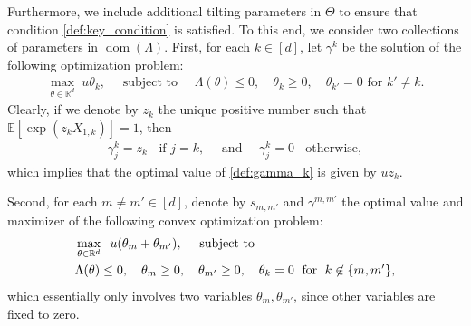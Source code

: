 \documentclass[aap,preprint]{imsart}
\newcommand{\Exp}{{\mathbb{E}}}
\newcommand{\bR}{{\mathbb{R}}}
\theoremstyle{plain}
\theoremstyle{definition}
\begin{document}
 

Furthermore, we include additional tilting parameters in $\Theta$ to ensure that condition \eqref{def:key_condition} is satisfied. 
To this end, we consider two collections of parameters in $\operatorname{dom}(\Lambda)$. 
First, for each $k \in [d]$, let $\gamma^k$ be the  solution of the following optimization problem:
\begin{align}
\label{def:gamma_k}
\max_{\theta \in \bR^d} \; u \theta_k,\quad \text{ subject to }\quad
\Lambda(\theta) \leq 0, \quad\theta_k \geq 0, \quad\theta_{k'} = 0 \text{ for } k' \neq k.
\end{align}
Clearly, if we denote by $z_k$ the unique positive number such that $\Exp[\exp(z_k X_{1,k})] = 1$, then 
\begin{align*}
\gamma^{k}_{j} = 
    z_k \;\; \text{ if } j = k, \quad \text{ and }\quad 
     \gamma^{k}_{j} = 0 \;\; \text{ otherwise},
\end{align*}
which implies that the optimal value of \eqref{def:gamma_k} is given by $u z_k$.


Second, for each $m \neq m'\in [d]$, denote by $s_{m,m'}$ and $\gamma^{m,m'
}$ the optimal value and maximizer of the following convex optimization problem:
\begin{align}
\label{def:gamma_k_kp}
\begin{split}
& \max_{\theta \in \bR^d} \;\;  u(\theta_m + \theta_{m'}), \quad \textup{ subject to }  \\
& \Lambda(\theta) \leq 0, \quad \theta_m \geq 0,\quad \theta_{m'} \geq 0,\quad 
\theta_{k} = 0\; \text{ for } \;k \not\in \{m,m'\},
\end{split}
\end{align}
which essentially only involves two variables $\theta_m, \theta_{m'}$, since other variables are fixed to zero.  
\end{document}
